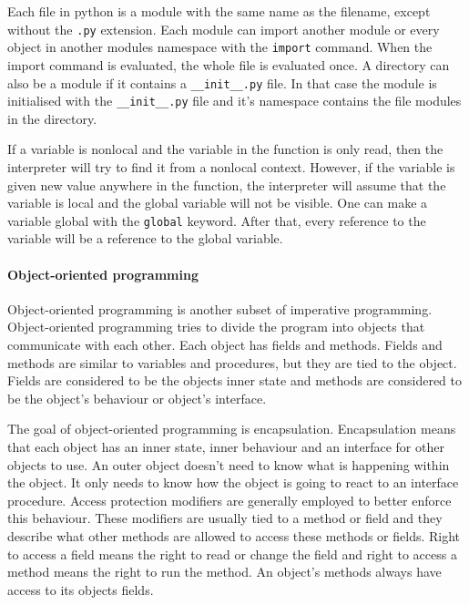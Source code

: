 Each file in python is a module with the same name as the filename, except without the \texttt{.py} extension. Each module can import another module or every object in another modules namespace with the \texttt{import} command. When the import command is evaluated, the whole file is evaluated once. A directory can also be a module if it contains a \texttt{\_\_init\_\_.py} file. In that case the module is initialised with the \texttt{\_\_init\_\_.py} file and it's namespace contains the file modules in the directory.



If a variable is nonlocal and the variable in the function is only read, then
the interpreter will try to find it from a nonlocal context. However, if the
variable is given new value anywhere in the function, the interpreter will
assume that the variable is local and the global variable will not be visible.
One can make a variable global with the \texttt{global} keyword. After that,
every reference to the variable will be a reference to the global variable.

\paragraph{Object-oriented programming}

Object-oriented programming is another subset of imperative programming.
Object-oriented programming tries to divide the program into objects that
communicate with each other. Each object has fields and methods. Fields and
methods are similar to variables and procedures, but they are tied to the
object. Fields are considered to be the objects inner state and methods are
considered to be the object's behaviour or object's
interface.\cite{website:object-orientation}

The goal of object-oriented programming is encapsulation. Encapsulation means
that each object has an inner state, inner behaviour and an interface for other
objects to use. An outer object doesn't need to know what is happening within
the object. It only needs to know how the object is going to react to an
interface procedure. Access protection modifiers are generally employed to
better enforce this behaviour. These modifiers are usually tied to a method or
field and they describe what other methods are allowed to access these methods
or fields. Right to access a field means the right to read or change the field
and right to access a method means the right to run the
method. An object's methods always have access to its objects
fields.\cite{website:access-modifiers}

